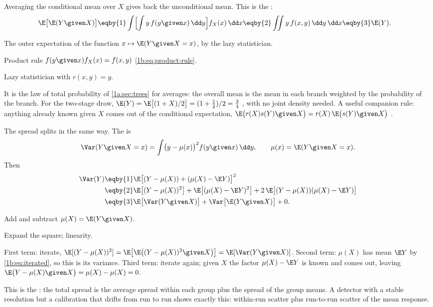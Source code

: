 Averaging the conditional mean over $X$ gives back the unconditional mean.
This is the  :
\begin{align}
  \E\bigl[\E(Y\given X)\bigr]
  &\eqby{1} \int\Bigl[\int y\,f(y\given x)\,\dd y\Bigr]f_X(x)\,\dd x
   \eqby{2} \iint y\,f(x,y)\,\dd y\,\dd x
   \eqby{3} \E(Y) .
  \label{1b:eq:iterated}
\end{align}
\begin{explain}
  \item The outer expectation of the function $x\mapsto\E(Y\given X=x)$, by the
        lazy statistician.
  \item Product rule $f(y\given x)f_X(x)=f(x,y)$ \eqref{1b:eq:product-rule}.
  \item Lazy statistician with $r(x,y)=y$.
\end{explain}
It is the law of total probability of \cref{1a:sec:trees} for averages: the
overall mean is the mean in each branch weighted by the probability of the
branch. For the two-stage draw,
$\E(Y)=\E\bigl[(1+X)/2\bigr]=(1+\tfrac12)/2=\tfrac34$ ,
with no joint density needed. A useful companion rule: anything already known
given $X$ comes out of the conditional expectation,
$\E\bigl(r(X)s(Y)\given X\bigr)=r(X)\,\E\bigl(s(Y)\given X\bigr)$
.

The spread splits in the same way. The  is 
\[
  \Var(Y\given X=x)=\int\bigl(y-\mu(x)\bigr)^2f(y\given x)\,\dd y,
  \qquad \mu(x)=\E(Y\given X=x).
\] Then
\begin{align}
  \Var(Y)
  &\eqby{1} \E\bigl[(Y-\mu(X))+(\mu(X)-\E Y)\bigr]^2 \nonumber\\
  &\eqby{2} \E\bigl[(Y-\mu(X))^2\bigr]+\E\bigl[(\mu(X)-\E Y)^2\bigr]
            +2\,\E\bigl[(Y-\mu(X))(\mu(X)-\E Y)\bigr] \nonumber\\
  &\eqby{3} \E\bigl[\Var(Y\given X)\bigr]+\Var\bigl[\E(Y\given X)\bigr]+0 .
  \label{1b:eq:total-var}
\end{align}
\begin{explain}
  \item Add and subtract $\mu(X)=\E(Y\given X)$.
  \item Expand the square; linearity.
  \item First term: iterate, $\E[(Y-\mu(X))^2]=\E\bigl[\E\bigl((Y-\mu(X))^2\given X\bigr)\bigr]
        =\E[\Var(Y\given X)]$. Second term: $\mu(X)$ has mean $\E Y$ by
        \eqref{1b:eq:iterated}, so this is its variance. Third term: iterate
        again; given $X$ the factor $\mu(X)-\E Y$ is known and comes out, leaving
        $\E\bigl(Y-\mu(X)\given X\bigr)=\mu(X)-\mu(X)=0$.
\end{explain}
This is the  : the
total spread is the average spread within each group plus the spread of the
group means. A detector with a stable resolution but a calibration that
drifts from run to run shows exactly this: within-run scatter plus run-to-run
scatter of the mean response.

